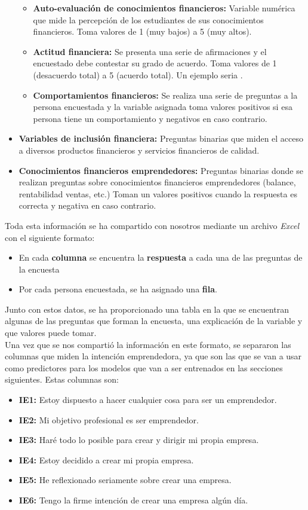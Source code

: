 \begin{itemize}
\begin{itemize}
		      \item \textbf{Auto-evaluación de conocimientos financieros:} Variable numérica que mide la percepción de los estudiantes de sus conocimientos financieros. Toma valores de 1 (muy bajos) a 5 (muy altos).
		      \item \textbf{Actitud financiera:} Se presenta una serie de afirmaciones y el encuestado debe contestar su grado de acuerdo. Toma valores de 1 (desacuerdo total) a 5 (acuerdo total). Un ejemplo seria .
		      \item \textbf{Comportamientos financieros:} Se realiza una serie de preguntas a la persona encuestada y la variable asignada toma valores positivos si esa persona tiene un comportamiento y negativos en caso contrario.
	      \end{itemize}
	\item \textbf{Variables de inclusión financiera:} Preguntas binarias que miden el acceso a diversos productos financieros y servicios financieros de calidad.
	\item \textbf{Conocimientos financieros emprendedores:} Preguntas binarias donde se realizan preguntas sobre conocimientos financieros emprendedores (balance, rentabilidad ventas, etc.) Toman un valores positivos cuando la respuesta es correcta y negativa en caso contrario.
\end{itemize}
\clearpage
Toda esta información se ha compartido con nosotros mediante un archivo \textit{Excel} con el siguiente formato:
\begin{itemize}
	\item En cada \textbf{columna} se encuentra la \textbf{respuesta} a cada una de las preguntas de la encuesta
	\item Por cada persona encuestada, se ha asignado una \textbf{fila}.
\end{itemize}
Junto con estos datos, se ha proporcionado una tabla en la que se encuentran algunas de las preguntas que forman la encuesta, una explicación de la variable y que valores puede tomar.\\
\linebreak
Una vez que se nos compartió la información en este formato, se separaron las columnas que miden la intención emprendedora, ya que son las que se van a usar como predictores para los modelos que van a ser entrenados en las secciones siguientes. Estas columnas son: 
\begin{itemize}
	\item \textbf{IE1:} Estoy dispuesto a hacer cualquier cosa para ser un emprendedor.
	\item \textbf{IE2:} Mi objetivo profesional es ser emprendedor.
	\item \textbf{IE3:} Haré todo lo posible para crear y dirigir mi propia empresa.
	\item \textbf{IE4:} Estoy decidido a crear mi propia empresa.
	\item \textbf{IE5:} He reflexionado seriamente sobre crear una empresa.
	\item \textbf{IE6:} Tengo la firme intención de crear una empresa algún día.
\end{itemize}

